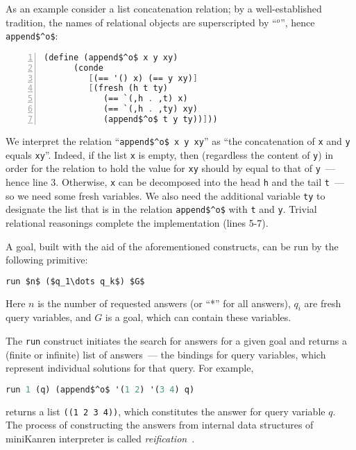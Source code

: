 As an example consider a list concatenation relation; by a well-established tradition, the names
of relational objects are superscripted by ``$^o$'', hence \lstinline{append$^o$}:

\begin{lstlisting}[mathescape=true,language=scheme,numbers=left,numberstyle=\small,stepnumber=1,numbersep=-5pt]
   (define (append$^o$ x y xy)
      (conde
         [(== '() x) (== y xy)]
         [(fresh (h t ty)
            (== `(,h . ,t) x)
            (== `(,h . ,ty) xy)
            (append$^o$ t y ty))]))
\end{lstlisting}

We interpret the relation ``\lstinline{append$^o$ x y xy}'' as ``the concatenation of \lstinline{x} and \lstinline{y}
equals \lstinline{xy}''. Indeed, if the list \lstinline{x} is empty, then (regardless the content of \lstinline{y}) in order for the relation to hold
the value for \lstinline{xy} should by equal to that of \lstinline{y}~--- hence line 3. Otherwise, \lstinline{x} can be decomposed into the head
\lstinline{h} and the tail \lstinline{t}~--- so we need some fresh variables. We also need the additional variable \lstinline{ty} to designate the list
that is in the relation \lstinline{append$^o$} with \lstinline{t} and \lstinline{y}. Trivial relational reasonings complete the implementation (lines 5-7).

A goal, built with the aid of the aforementioned constructs, can be run by the following primitive:

\begin{lstlisting}[mathescape=true,language=scheme]
   run $n$ ($q_1\dots q_k$) $G$
\end{lstlisting}

Here $n$ is the number of requested answers (or ``*'' for all answers), $q_i$ are fresh query variables, and $G$ is a goal, which can
contain these variables.

The \lstinline{run} construct initiates the search for answers for a given goal and returns a (finite or infinite) list
of answers~--- the bindings for query variables, which represent individual solutions for that query. For example,

\begin{lstlisting}[mathescape=true,language=scheme]
   run 1 (q) (append$^o$ '(1 2) '(3 4) q)
\end{lstlisting}

\noindent returns a list \lstinline{((1 2 3 4))}, which constitutes the answer for query variable $q$. The process of constructing
the answers from internal data structures of miniKanren interpreter is called \emph{reification}~\cite{WillThesis}.

